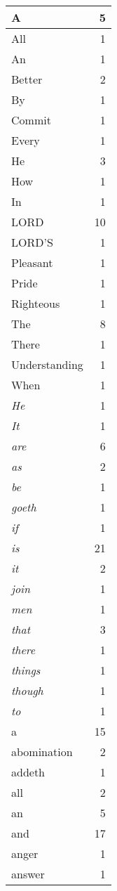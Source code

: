 \begin{center}
\begin{longtable}{l|r}
A & 5\\ \hline 
All & 1\\ \hline 
An & 1\\ \hline 
Better & 2\\ \hline 
By & 1\\ \hline 
Commit & 1\\ \hline 
Every & 1\\ \hline 
He & 3\\ \hline 
How & 1\\ \hline 
In & 1\\ \hline 
LORD & 10\\ \hline 
LORD'S & 1\\ \hline 
Pleasant & 1\\ \hline 
Pride & 1\\ \hline 
Righteous & 1\\ \hline 
The & 8\\ \hline 
There & 1\\ \hline 
Understanding & 1\\ \hline 
When & 1\\ \hline 
\emph{He} & 1\\ \hline 
\emph{It} & 1\\ \hline 
\emph{are} & 6\\ \hline 
\emph{as} & 2\\ \hline 
\emph{be} & 1\\ \hline 
\emph{goeth} & 1\\ \hline 
\emph{if} & 1\\ \hline 
\emph{is} & 21\\ \hline 
\emph{it} & 2\\ \hline 
\emph{join} & 1\\ \hline 
\emph{men} & 1\\ \hline 
\emph{that} & 3\\ \hline 
\emph{there} & 1\\ \hline 
\emph{things} & 1\\ \hline 
\emph{though} & 1\\ \hline 
\emph{to} & 1\\ \hline 
a & 15\\ \hline 
abomination & 2\\ \hline 
addeth & 1\\ \hline 
all & 2\\ \hline 
an & 5\\ \hline 
and & 17\\ \hline 
anger & 1\\ \hline 
answer & 1\\ \hline 

\end{longtable}
\end{center}
